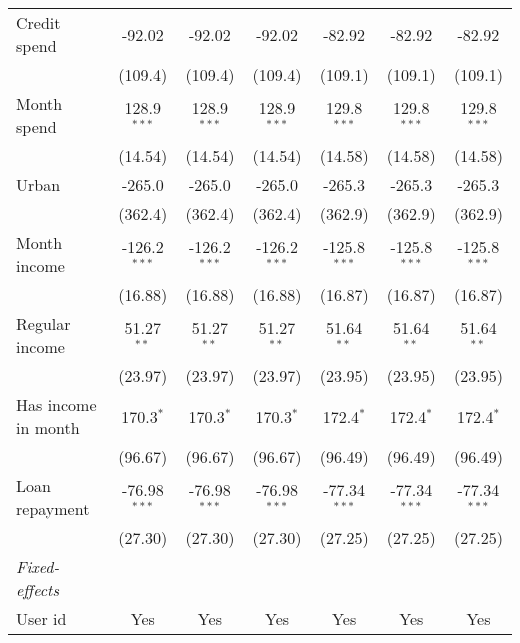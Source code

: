 \begin{table}[htbp]
\begin{threeparttable}[b]
\begin{tabular}{lcccccc}
         Credit spend        & -92.02         & -92.02         & -92.02         & -82.92         & -82.92         & -82.92\\   
                             & (109.4)        & (109.4)        & (109.4)        & (109.1)        & (109.1)        & (109.1)\\   
         Month spend         & 128.9$^{***}$  & 128.9$^{***}$  & 128.9$^{***}$  & 129.8$^{***}$  & 129.8$^{***}$  & 129.8$^{***}$\\   
                             & (14.54)        & (14.54)        & (14.54)        & (14.58)        & (14.58)        & (14.58)\\   
         Urban               & -265.0         & -265.0         & -265.0         & -265.3         & -265.3         & -265.3\\   
                             & (362.4)        & (362.4)        & (362.4)        & (362.9)        & (362.9)        & (362.9)\\   
         Month income        & -126.2$^{***}$ & -126.2$^{***}$ & -126.2$^{***}$ & -125.8$^{***}$ & -125.8$^{***}$ & -125.8$^{***}$\\   
                             & (16.88)        & (16.88)        & (16.88)        & (16.87)        & (16.87)        & (16.87)\\   
         Regular income      & 51.27$^{**}$   & 51.27$^{**}$   & 51.27$^{**}$   & 51.64$^{**}$   & 51.64$^{**}$   & 51.64$^{**}$\\   
                             & (23.97)        & (23.97)        & (23.97)        & (23.95)        & (23.95)        & (23.95)\\   
         Has income in month & 170.3$^{*}$    & 170.3$^{*}$    & 170.3$^{*}$    & 172.4$^{*}$    & 172.4$^{*}$    & 172.4$^{*}$\\   
                             & (96.67)        & (96.67)        & (96.67)        & (96.49)        & (96.49)        & (96.49)\\   
         Loan repayment      & -76.98$^{***}$ & -76.98$^{***}$ & -76.98$^{***}$ & -77.34$^{***}$ & -77.34$^{***}$ & -77.34$^{***}$\\   
                             & (27.30)        & (27.30)        & (27.30)        & (27.25)        & (27.25)        & (27.25)\\   
         \midrule
         \emph{Fixed-effects}\\
         User id             & Yes            & Yes            & Yes            & Yes            & Yes            & Yes\\  

\end{tabular}
\end{threeparttable}
\end{table}
